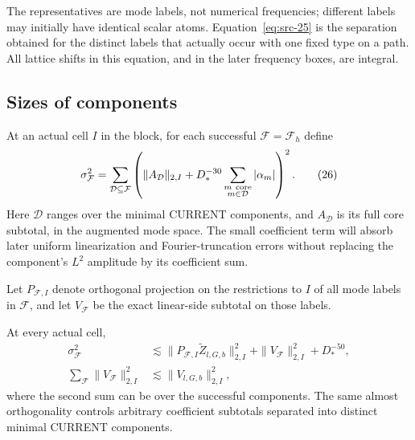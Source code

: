 The representatives are mode labels, not numerical frequencies;
different labels may initially have identical scalar atoms.
Equation~\eqref{eq:src-25} is the separation obtained for the
distinct labels that actually occur with one fixed type on a path.
All lattice shifts in this equation, and in the later frequency
boxes, are integral.

\subsection{Sizes of components}

At an actual cell \(I\) in the block, for each successful
\(\mathcal F=\mathcal F_h\) define
\begin{equation*}
 \sigma_{\mathcal F}^2
   =\sum_{\mathcal D\subseteq\mathcal F}
      \left(
        \|A_{\mathcal D}\|_{2,I}
        +D_*^{-30}
          \sum_{\substack{m\ {\rm core}\\m\in\mathcal D}}
                         |\alpha_m|
      \right)^2 .
 \tag{26}\label{eq:src-26}
\end{equation*}
Here \(\mathcal D\) ranges over the minimal CURRENT components, and
\(A_{\mathcal D}\) is its full core subtotal, in the augmented mode
space.  The small coefficient term will absorb later uniform
linearization and Fourier-truncation errors without replacing
the component's \(L^2\) amplitude by its coefficient sum.

Let \(P_{\mathcal F,I}\) denote orthogonal projection on the
restrictions to \(I\) of all mode labels in \(\mathcal F\), and let
\(V_{\mathcal F}\) be the exact linear-side subtotal on those labels.

\begin{lemma}
\label{lem:component-size}
At every actual cell,
\begin{equation*}
 \begin{split}
 \sigma_{\mathcal F}^2
 &\lesssim
    \|P_{\mathcal F,I}\widetilde Z_{l,G,b}\|_{2,I}^2
       +\|V_{\mathcal F}\|_{2,I}^2+D_*^{-50},\\
 \sum_{\mathcal F}\|V_{\mathcal F}\|_{2,I}^2
 &\lesssim\|V_{l,G,b}\|_{2,I}^2 ,
 \end{split}
 \tag{27}\label{eq:src-27}
\end{equation*}
where the second sum can be over the successful components.
The same almost orthogonality controls arbitrary coefficient
subtotals separated into distinct minimal CURRENT components.
\end{lemma}

